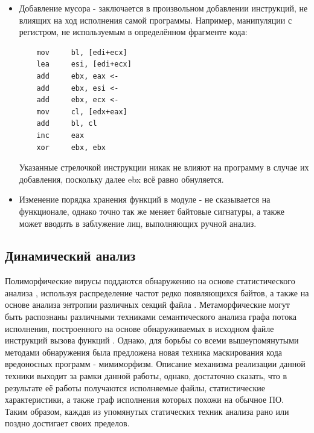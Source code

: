 \begin {itemize}
Пример:
	\begin{lstlisting}
	call    lstrcmpA
	jnz     short loc_4012D4
	push    40h; 1
	push    offset aCaption; 1
	push    offset aRightAnswer; 1
	push    [ebp+hWnd]; 1
	call    MessageBoxA; 1
	jmp     short loc_4012E8
loc_4012D4:
	push    10h; 2
	push    offset aCaption; 2
	push    offset aWrongAnswer; 2
	push    [ebp+hWnd]; 2
	call    MessageBoxA; 2
loc_4012E8:
	call    ExitProcess
	\end{lstlisting}
	Замена первоначальной инструкции jnz на jz (переход в случае неравенства на переход в случае равенства) и перестановка местами блоков, помеченных как 1 и 2 не меняет смысловую нагрузку, выполняемую программой, однако позволяет значительно поменять её структуру. Это создаёт значительные трудности как в случае автоматического, так и ручного исследования, если таковых замен произведено значительное количество.
	\item Добавление мусора - заключается в произвольном добавлении инструкций, не влиящих на ход исполнения самой программы. Например, манипуляции с регистром, не используемым в определённом фрагменте кода:
	\begin{lstlisting}
	mov     bl, [edi+ecx]
	lea     esi, [edi+ecx]
	add     ebx, eax <-
	add     ebx, esi <-
	add     ebx, ecx <-
	mov     cl, [edx+eax]
	add     bl, cl
	inc     eax
	xor     ebx, ebx
	\end{lstlisting}
	Указанные стрелочкой инструкции никак не влияют на программу в случае их добавления, поскольку далее ebx всё равно обнуляется.
	\item Изменение порядка хранения функций в модуле - не сказывается на функционале, однако точно так же меняет байтовые сигнатуры, а также может вводить в заблужение лиц, выполняющих ручной анализ.
\end {itemize}

\subsection{Динамический анализ}
Полиморфические вирусы поддаются обнаружению на основе статистического анализа \cite{PAYLOADDETECTION, ANAGRAM}, используя распределение частот редко появляющихся байтов, а также на основе анализа энтропии различных секций файла \cite{ENTROPYANALYSIS}. Метаморфические могут быть распознаны различными техниками семантического анализа графа потока исполнения, построенного на основе обнаруживаемых в исходном файле инструкций вызова функций \cite{METAAWARE}. Однако, для борьбы со всеми вышеупомянутыми методами обнаружения была предложена новая техника маскирования кода вредоносных программ - мимиморфизм\cite{MIMIMORPHISM}. Описание механизма реализации данной техники выходит за рамки данной работы, однако, достаточно сказать, что в результате её работы получаются исполняемые файлы, статистические характеристики, а также граф исполнения которых похожи на обычное ПО. Таким образом, каждая из упомянутых статических техник анализа рано или поздно достигает своих пределов.

